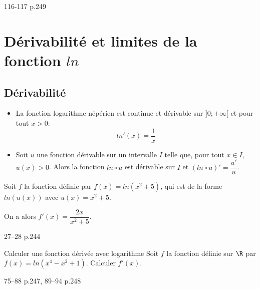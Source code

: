 \documentclass[a4paper]{article}
\begin{document}
\begin{exercices}{}{}
116-117 p.249
\end{exercices}


\pagebreak
\section{Dérivabilité et limites de la fonction $ln$}

\subsection{Dérivabilité}

\begin{propriete}{}{}

\begin{itemize}[label=\textbullet]
  \item 
  La fonction logarithme népérien est continue et dérivable sur $]0;+\infty[$ et pour tout $x>0$:
  $$ln'(x)=\dfrac{1}{x}$$
  \item Soit $u$ une fonction dérivable sur un intervalle $I$ telle que, pour tout $x\in I$, $u(x)>0$. Alors la fonction $ln \circ u$ est dérivable sur 
  $I$ et $(ln \circ u)'=\dfrac{u'}{u}$.
\end{itemize}
\end{propriete}

\begin{demonstrationp}{}{}
  \vspace{8cm}
\end{demonstrationp}

\begin{example}{}{}
Soit $f$ la fonction définie par $f(x)=ln(x^2+5)$, qui est de la forme $ln(u(x))$ avec $u(x)=x^2+5$.

On a alors $f'(x)=\dfrac{2x}{x^2+5}$.
\end{example}

\begin{exercices}{}{}
27--28 p.244
\end{exercices}


\begin{methode}{Calculer une fonction dérivée avec logarithme}{}
Soit $f$ la fonction définie sur $\R$ par $f(x)=ln(x^4-x^2+1)$. Calculer $f'(x)$.

\vspace{6cm}
\end{methode}

\begin{exercices}{}{}
75--88 p.247, 89--94 p.248
\end{exercices}
\end{document}
